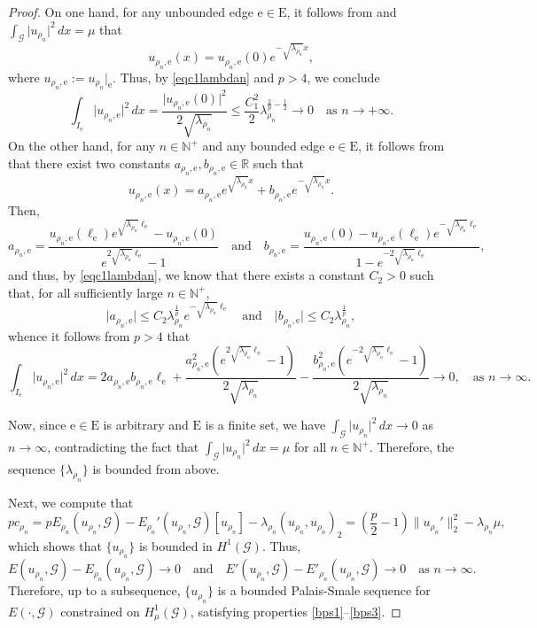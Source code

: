 \documentclass[11pt]{amsart}
\newcommand{\abs}[1]{\lvert#1\rvert}
\newcommand{\norm}[1]{\lVert#1\rVert}
\newcommand{\G}{\mathcal{G}}
\newcommand{\E}{\mathrm{E}}
\newcommand{\R}{\mathbb{R}}
\newcommand{\e}{\mathrm{e}}
\numberwithin{equation}{section}
\begin{document}
\begin{proof}
On one hand, for any unbounded edge $\e \in \E$, it follows from \cite[Remark 4 in Section 3.3]{AD} and $\int_\G\abs{u_{\rho_n}}^2\, dx = \mu$ that
$$
u_{\rho_n,\e}(x)=u_{\rho_n,\e}(0)e^{-\sqrt{\lambda_{\rho_n}}x},
$$
where $u_{\rho_n,\e}:=u_{\rho_n}|_\e$. Thus, by \eqref{eqc1lambdan} and $p >4$, we conclude
$$
\int_{I_\e} \abs{u_{\rho_n,\e}}^2 \, dx =\frac{\abs{u_{\rho_n,\e}(0)}^2}{2\sqrt{\lambda_{\rho_n}}} \leq \frac{C_1^2}{2}\lambda_{\rho_n}^{\frac{2}{p}-\frac{1}{2}}\to 0 \quad \text{as }n \to +\infty.
$$
On the other hand, for any $n \in \mathbb{N}^+$ and any bounded edge $\e \in \E$, it follows from \cite[Remark 4 in Section 3.3]{AD} that there exist two constants $a_{\rho_n,\e}, b_{\rho_n,\e} \in \R$ such that  
$$
u_{\rho_n,\e}(x)=a_{\rho_n,\e} e^{\sqrt{\lambda_{\rho_n}}x} + b_{\rho_n,\e} e^{-\sqrt{\lambda_{\rho_n}}x}.
$$
Then,
$$
a_{\rho_n,\e} = \frac{u_{\rho_n,\e}(\ell_\e)e^{\sqrt{\lambda_{\rho_n}}\ell_\e}-u_{\rho_n,\e}(0)}{e^{2\sqrt{\lambda_{\rho_n}}\ell_\e}-1}\quad  \text{and} \quad b_{\rho_n,\e} =\frac{u_{\rho_n,\e}(0)-u_{\rho_n,\e}(\ell_\e)e^{-\sqrt{\lambda_{\rho_n}}\ell_\e}}{1-e^{-2\sqrt{\lambda_{\rho_n}}\ell_\e}},
$$
and thus, by \eqref{eqc1lambdan}, we know that there exists a constant $C_2>0$ such that, for all sufficiently large $n\in\mathbb{N}^+$,
$$
\abs{a_{\rho_n,\e}} \leq C_2 \lambda_{\rho_n}^\frac{1}{p}e^{-\sqrt{\lambda_{\rho_n}}\ell_\e}\quad  \text{and} \quad \abs{b_{\rho_n,\e}} \leq C_2 \lambda_{\rho_n}^\frac{1}{p},$$
whence it follows from $p>4$ that
$$
\int_{I_\e} \abs{u_{\rho_n,\e}}^2 \, dx=2a_{\rho_n,\e} b_{\rho_n,\e} \ell_\e +\frac{a_{\rho_n,\e}^2(e^{2\sqrt{\lambda_{\rho_n}}\ell_\e} -1)}{2\sqrt{\lambda_{\rho_n}}} - \frac{b_{\rho_n,\e}^2(e^{-2\sqrt{\lambda_{\rho_n}}\ell_\e} -1)}{2\sqrt{\lambda_{\rho_n}}} \to 0, \quad \text{as }n \to \infty.
$$

Now, since $\e \in \E$ is arbitrary and $\E$ is a finite set, we have $\int_\G\abs{u_{\rho_n}}^2\, dx \to 0$ as $n \to \infty$, contradicting the fact that $\int_\G\abs{u_{\rho_n}}^2\, dx =\mu $ for all $n \in \mathbb{N}^+$. Therefore, the sequence $\{\lambda_{\rho_n}\}$ is bounded from above.

Next, we compute that 
$$
pc_{\rho_n}=pE_{\rho_n}(u_{\rho_n},\G)-E_{\rho_n}'(u_{\rho_n} ,\G)[u_{\rho_n}]-\lambda_{\rho_n}(u_{\rho_n},u_{\rho_n})_2=(\frac{p}{2}-1)\norm{u_{\rho_n}'}_2^2-\lambda_{\rho_n}\mu,
$$
which shows that $\{u_{\rho_n}\}$ is bounded in $H^1(\G)$. Thus,
$$
E(u_{\rho_n},\G)-E_{\rho_n}(u_{\rho_n},\G)\to 0  \quad \text{and}\quad E'(u_{\rho_n},\G)-E'_{\rho_n}(u_{\rho_n},\G)\to 0 \quad \text{as }n \to \infty.
$$
Therefore, up to a subsequence, $\{u_{\rho_n}\}$ is a bounded Palais-Smale sequence for $E(\cdot, \G)$ constrained on $H_\mu^1(\G)$, satisfying properties \ref{bps1}--\ref{bps3}.
\end{proof}
\end{document}
